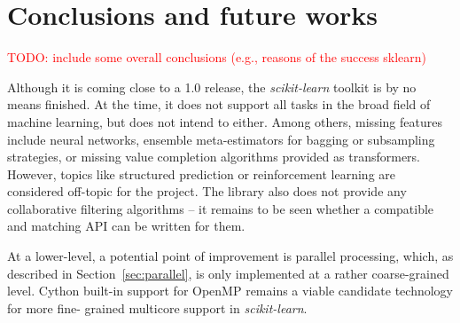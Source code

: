 \documentclass{llncs}
\newcommand{\sklearn}{\textit{scikit-learn}\xspace}
\DeclareRobustCommand{\VAN}[3]{#2}
\begin{document}
\section{Conclusions and future works}
\label{sec:conclusions}

\textcolor{red}{TODO: include some overall conclusions (e.g., reasons of the success sklearn)}

Although it is coming close to a 1.0 release, the \sklearn toolkit is by no
means finished. At the time, it does not support all tasks in the broad field of
machine learning, but does not intend to either. Among others, missing features
include neural networks, ensemble meta-estimators for bagging or subsampling
strategies, or missing value completion algorithms provided as transformers.
However, topics like structured prediction or reinforcement learning are
considered off-topic for the project. The library also does not provide any
collaborative filtering algorithms -- it remains to be seen whether a compatible
and matching API can be written for them.

At a lower-level, a potential point of improvement is parallel processing,
which, as described in Section~\ref{sec:parallel}, is only implemented at a
rather coarse-grained level. Cython built-in support for OpenMP
\citep{dagum1998openmp} remains a viable candidate technology for more fine-
grained multicore support in \sklearn.



\DeclareRobustCommand{\VAN}[3]{#3}

\end{document}
